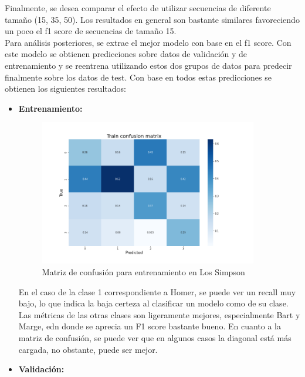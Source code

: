 Finalmente, se desea comparar el efecto de utilizar secuencias de diferente tamaño (15, 35, 50). Los resultados en general son bastante similares favoreciendo un poco el f1 score de secuencias de tamaño 15.\\

Para análisis posteriores, se extrae el mejor modelo con base en el f1 score. Con este modelo se obtienen predicciones sobre datos de validación y de entrenamiento y se reentrena utilizando estos dos grupos de datos para predecir finalmente sobre los datos de test. Con base en todos estas predicciones se obtienen los siguientes resultados:

\begin{itemize}
    \item \textbf{Entrenamiento:}
    
    
    \begin{figure}[H]
        \centering
        \includegraphics[width=0.9\textwidth]{results/simpson/deepModels/Train.png}
        \caption{Matriz de confusión para entrenamiento en Los Simpson}
        \label{fig:my_label}
    \end{figure}
    
    En el caso de la clase 1 correspondiente a Homer, se puede ver un recall muy bajo, lo que indica la baja certeza al clasificar un modelo como de su clase. Las métricas de las otras clases son ligeramente mejores, especialmente Bart y Marge, edn donde se aprecia un F1 score bastante bueno. En cuanto a la matriz de confusión, se puede ver que en algunos casos la diagonal está más cargada, no obstante, puede ser mejor.
    
    \item \textbf{Validación:}
    
    

\end{itemize}
